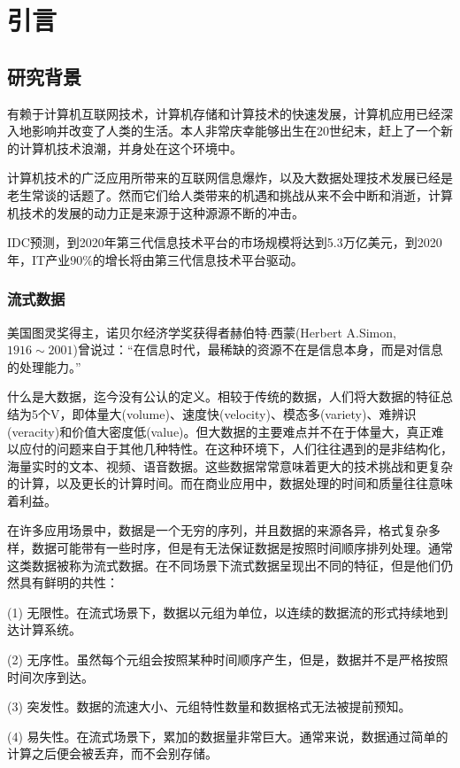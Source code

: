 
\chapter{引言}
\label{chapter:intro}

\section{研究背景}
有赖于计算机互联网技术，计算机存储和计算技术的快速发展，计算机应用已经深入地影响并改变了人类的生活。本人非常庆幸能够出生在20世纪末，赶上了一个新的计算机技术浪潮，并身处在这个环境中。

计算机技术的广泛应用所带来的互联网信息爆炸，以及大数据处理技术发展已经是老生常谈的话题了。然而它们给人类带来的机遇和挑战从来不会中断和消逝，计算机技术的发展的动力正是来源于这种源源不断的冲击。

IDC预测，到2020年第三代信息技术平台的市场规模将达到5.3万亿美元，到2020年，IT产业$90\%$的增长将由第三代信息技术平台驱动。
\subsection{流式数据}

美国图灵奖得主，诺贝尔经济学奖获得者赫伯特$\cdot$西蒙(Herbert A.Simon, $1916\sim2001$)曾说过：“在信息时代，最稀缺的资源不在是信息本身，而是对信息的处理能力。”

什么是大数据，迄今没有公认的定义。相较于传统的数据，人们将大数据的特征总结为5个V，即体量大(volume)、速度快(velocity)、模态多(variety)、难辨识(veracity)和价值大密度低(value)\cite{cxq2014Survey}。但大数据的主要难点并不在于体量大，真正难以应付的问题来自于其他几种特性。在这种环境下，人们往往遇到的是非结构化，海量实时的文本、视频、语音数据。这些数据常常意味着更大的技术挑战和更复杂的计算，以及更长的计算时间。而在商业应用中，数据处理的时间和质量往往意味着利益。

在许多应用场景中，数据是一个无穷的序列，并且数据的来源各异，格式复杂多样，数据可能带有一些时序，但是有无法保证数据是按照时间顺序排列处理。通常这类数据被称为流式数据。在不同场景下流式数据呈现出不同的特征，但是他们仍然具有鲜明的共性：

(1) 无限性。在流式场景下，数据以元组为单位，以连续的数据流的形式持续地到达计算系统。

(2) 无序性。虽然每个元组会按照某种时间顺序产生，但是，数据并不是严格按照时间次序到达。

(3) 突发性。数据的流速大小、元组特性数量和数据格式无法被提前预知。

(4) 易失性。在流式场景下，累加的数据量非常巨大。通常来说，数据通过简单的计算之后便会被丢弃，而不会别存储。

